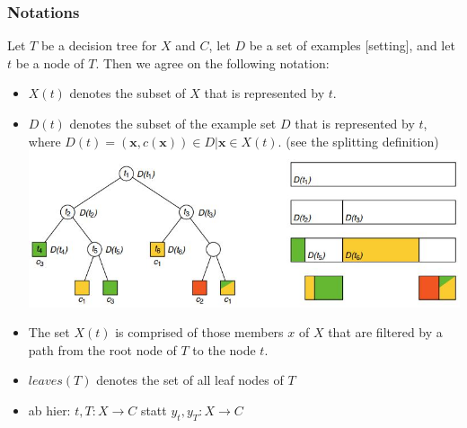 \documentclass[11pt,a4paper]{article}
\begin{document}
\begin{flushleft}
\subsubsection{Notations}
Let $T$ be a decision tree for $X$ and $C$, let $D$ be a set of examples [setting], and let $t$ be
a node of $T$. Then we agree on the following notation:
\begin{itemize}
\item  $X(t)$ denotes the subset of $X$ that is represented by $t$.
\item $D(t)$ denotes the subset of the example set $D$ that is represented by $t$, where
$D(t) = {(\textbf{x}, c(\textbf{x})) \in D | \textbf{x} \in X(t)}$. (see the splitting definition)
\includegraphics[width= \textwidth]{dTree}
\item The set $X(t)$ is comprised of those members $x$ of $X$ that are filtered by a path from the root
node of $T$ to the node $t$.
\item $leaves(T)$ denotes the set of all leaf nodes of $T$
\item ab hier: $t, T : X \rightarrow C$ statt $ y_t, y_T : X \rightarrow C$
\end{itemize}

\end{flushleft}
\end{document}
